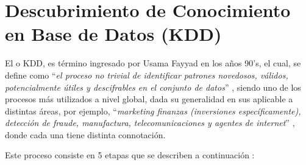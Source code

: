 \section{Descubrimiento de Conocimiento en Base de Datos (KDD)}

El  o KDD, es término ingresado por Usama Fayyad en los años 90’s, el cual, se define como “\textit{el proceso no trivial de identiﬁcar patrones novedosos, válidos, potencialmente útiles y descifrables en el conjunto de datos}” \parencite{dreiseitl2002logistic}, siendo uno de los procesos más utilizados a nivel global, dada su generalidad en sus aplicable a distintas áreas, por ejemplo, “\textit{marketing finanzas (inversiones específicamente), detección de fraude, manufactura, telecomunicaciones y agentes de internet}” \parencite{fayyad1996data}, donde cada una tiene distinta connotación.

Este proceso consiste en 5 etapas que se describen a continuación \parencite{dreiseitl2002logistic}:

